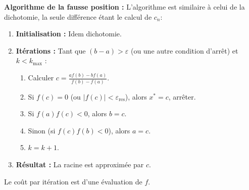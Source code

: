 \textbf{Algorithme de la fausse position :}
L'algorithme est similaire à celui de la dichotomie, la seule différence étant le calcul de $c_n$:
\begin{enumerate}
    \item \textbf{Initialisation :} Idem dichotomie.
    \item \textbf{Itérations :} Tant que $(b-a) > \varepsilon$ (ou une autre condition d'arrêt) et $k < k_{\text{max}}$ :
    \begin{enumerate}
        \item Calculer $c = \frac{a f(b) - b f(a)}{f(b) - f(a)}$.
        \item Si $f(c) = 0$ (ou $|f(c)| < \varepsilon_{\text{res}}$), alors $x^*=c$, arrêter.
        \item Si $f(a)f(c) < 0$, alors $b=c$.
        \item Sinon (si $f(c)f(b) < 0$), alors $a=c$.
        \item $k = k+1$.
    \end{enumerate}
    \item \textbf{Résultat :} La racine est approximée par $c$.
\end{enumerate}
Le coût par itération est d'une évaluation de $f$.

